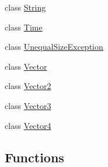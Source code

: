 \begin{DoxyCompactItemize}
\item 
class \hyperlink{classprism_1_1_string}{String}
\item 
class \hyperlink{classprism_1_1_time}{Time}
\item 
class \hyperlink{classprism_1_1_unequal_size_exception}{Unequal\+Size\+Exception}
\item 
class \hyperlink{classprism_1_1_vector}{Vector}
\item 
class \hyperlink{classprism_1_1_vector2}{Vector2}
\item 
class \hyperlink{classprism_1_1_vector3}{Vector3}
\item 
class \hyperlink{classprism_1_1_vector4}{Vector4}
\end{DoxyCompactItemize}
\subsection*{Functions}
